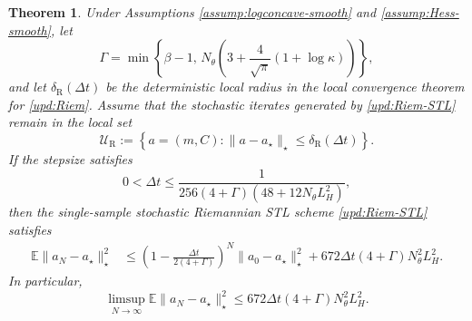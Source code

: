 \documentclass[11pt]{article}
\theoremstyle{plain}
\newtheorem{theorem}{Theorem}[section]
\theoremstyle{definition}
\theoremstyle{remark}
\newcommand{\E}{\mathbb{E}}
\begin{document}
\begin{theorem}\label{thm:loc-stoch-Riem-STL}
    Under Assumptions \ref{assump:logconcave-smooth} and \ref{assump:Hess-smooth}, let
    \begin{equation*}
        \Gamma
        =
        \min\left\{
            \beta-1,\,
            N_\theta\left(3+\frac{4}{\sqrt{\pi}}(1+\log\kappa)\right)
        \right\},
    \end{equation*}
    and let $\delta_{\mathrm R}(\Delta t)$ be the deterministic local radius in the local convergence theorem for \eqref{upd:Riem}. Assume that the stochastic iterates generated by \eqref{upd:Riem-STL} remain in the local set
    \begin{equation*}
        \mathcal{U}_{\mathrm R}
        :=
        \left\{
            a=(m,C):
            \|a-a_\star\|_\star\leq \delta_{\mathrm R}(\Delta t)
        \right\}.
    \end{equation*}
    If the stepsize satisfies
    \begin{equation*}
        0<\Delta t
        \leq
        \frac{1}{
            256(4+\Gamma)(48+12N_\theta L_H^2)
        },
    \end{equation*}
    then the single-sample stochastic Riemannian STL scheme \eqref{upd:Riem-STL} satisfies
    \begin{align*}
        \E\|a_N-a_\star\|_\star^2
        &\leq
        \left(
            1-\frac{\Delta t}{2(4+\Gamma)}
        \right)^N
        \|a_0-a_\star\|_\star^2 +
        672\Delta t(4+\Gamma)N_\theta^2L_H^2.
    \end{align*}
    In particular,
    \begin{equation*}
        \limsup_{N\to\infty}
        \E\|a_N-a_\star\|_\star^2
        \leq
        672\Delta t(4+\Gamma)N_\theta^2L_H^2.
    \end{equation*}
\end{theorem}
\end{document}
